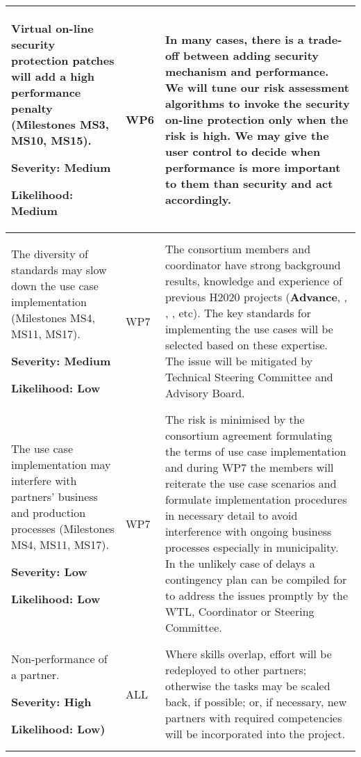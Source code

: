 \documentclass[a4paper,11pt]{article}
\begin{document}
\begin{longtable}{| p{3.5cm} | p{1.5cm} | p{11.8cm}  |}
\\\hline
Virtual  on-line security protection patches will add a high performance penalty (Milestones MS3, MS10, MS15). 
\par\vspace{1ex}
\textbf{Severity: Medium}
\par
\textbf{Likelihood: Medium}&
WP6  &  
In many cases, there is a trade-off between adding security mechanism and performance. We will tune our risk assessment algorithms to invoke the security on-line protection only when the risk is high. We may give the user control to decide when performance is more important to them than security and act accordingly.

\\\hline
The diversity of standards may slow down the use case implementation (Milestones MS4, MS11, MS17).  
\par\vspace{1ex}
\textbf{Severity: Medium}
\par\textbf{Likelihood: Low}
& WP7 & The consortium members and coordinator have  strong background results, knowledge and experience of previous H2020 projects (\textbf{Advance}, \paraphrase{}, \rephrase{}, \teamplay{}, etc). The key standards for implementing the use cases will be selected based on these expertise. The issue will be mitigated by Technical Steering Committee and Advisory Board.

\\\hline
The use case implementation may interfere with partners' business and production processes (Milestones MS4, MS11, MS17).
\par\vspace{1ex}
\textbf{Severity: Low}
\par\textbf{Likelihood: Low}
& WP7 &The risk is minimised by the consortium agreement formulating the terms of use case implementation and during WP7 the members will reiterate the use case scenarios and formulate implementation procedures in necessary detail to avoid interference with ongoing business processes especially in municipality. In the unlikely case of delays a contingency plan can be compiled for to address the issues promptly by the WTL, Coordinator or Steering Committee.

\\\hline

Non-performance of a partner.
\par\vspace{1ex}
\textbf{Severity: High}
\par
\textbf{Likelihood: Low)} &
ALL & 
Where skills overlap, 
effort will be redeployed to other partners;
otherwise the tasks may be scaled back, if possible; or,
if necessary, new partners with required competencies will be
incorporated into the project.
\\\hline


\end{longtable}
\end{document}
